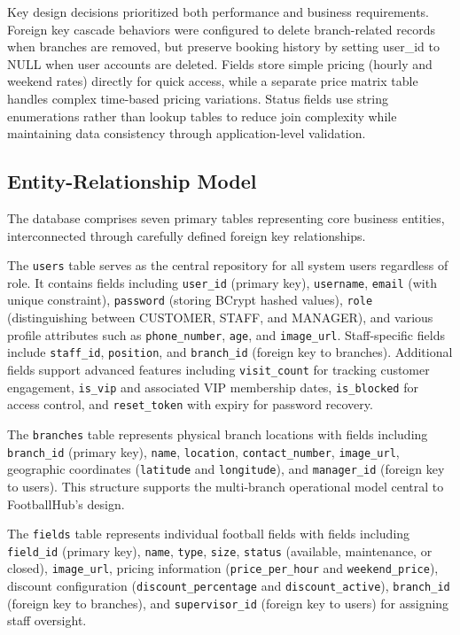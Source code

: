Key design decisions prioritized both performance and business requirements. Foreign key cascade behaviors were configured to delete branch-related records when branches are removed, but preserve booking history by setting user\_id to NULL when user accounts are deleted. Fields store simple pricing (hourly and weekend rates) directly for quick access, while a separate price matrix table handles complex time-based pricing variations. Status fields use string enumerations rather than lookup tables to reduce join complexity while maintaining data consistency through application-level validation.

\subsection{Entity-Relationship Model}

The database comprises seven primary tables representing core business entities, interconnected through carefully defined foreign key relationships.

The \texttt{users} table serves as the central repository for all system users regardless of role. It contains fields including \texttt{user\_id} (primary key), \texttt{username}, \texttt{email} (with unique constraint), \texttt{password} (storing BCrypt hashed values), \texttt{role} (distinguishing between CUSTOMER, STAFF, and MANAGER), and various profile attributes such as \texttt{phone\_number}, \texttt{age}, and \texttt{image\_url}. Staff-specific fields include \texttt{staff\_id}, \texttt{position}, and \texttt{branch\_id} (foreign key to branches). Additional fields support advanced features including \texttt{visit\_count} for tracking customer engagement, \texttt{is\_vip} and associated VIP membership dates, \texttt{is\_blocked} for access control, and \texttt{reset\_token} with expiry for password recovery.

The \texttt{branches} table represents physical branch locations with fields including \texttt{branch\_id} (primary key), \texttt{name}, \texttt{location}, \texttt{contact\_number}, \texttt{image\_url}, geographic coordinates (\texttt{latitude} and \texttt{longitude}), and \texttt{manager\_id} (foreign key to users). This structure supports the multi-branch operational model central to FootballHub's design.

The \texttt{fields} table represents individual football fields with fields including \texttt{field\_id} (primary key), \texttt{name}, \texttt{type}, \texttt{size}, \texttt{status} (available, maintenance, or closed), \texttt{image\_url}, pricing information (\texttt{price\_per\_hour} and \texttt{weekend\_price}), discount configuration (\texttt{discount\_percentage} and \texttt{discount\_active}), \texttt{branch\_id} (foreign key to branches), and \texttt{supervisor\_id} (foreign key to users) for assigning staff oversight.

